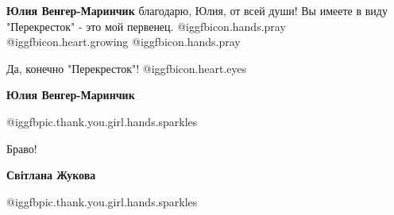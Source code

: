 \begin{itemize}
\begin{itemize}
 
\textbf{Юлия Венгер-Маринчик} благодарю, Юлия, от всей души! Вы имеете в виду
"Перекресток" - это мой первенец. @igg{fbicon.hands.pray}
@igg{fbicon.heart.growing}  @igg{fbicon.hands.pray} 

 
Да, конечно "Перекресток"! @igg{fbicon.heart.eyes} 

 
\textbf{Юлия Венгер-Маринчик}

@igg{fbpic.thank.you.girl.hands.sparkles}
\end{itemize}

 
Браво!

\begin{itemize}
 
\textbf{Світлана Жукова}

@igg{fbpic.thank.you.girl.hands.sparkles}

\end{itemize}

\end{itemize}

